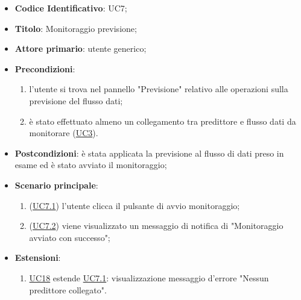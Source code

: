 		\begin{itemize}
			\item\textbf{Codice Identificativo}: UC7;
			\item\textbf{Titolo}: Monitoraggio previsione;
			\item\textbf{Attore primario}: utente generico;
			\item\textbf{Precondizioni}:
				\begin{enumerate}
					\item l'utente si trova nel pannello "Previsione" relativo alle operazioni sulla previsione del flusso dati;
					\item è stato effettuato almeno un collegamento tra predittore e flusso dati da monitorare (\hyperref[par:UC3]{UC3}).
				\end{enumerate}		
	\item\textbf{Postcondizioni}: è stata applicata la previsione al flusso di dati preso in esame ed è stato avviato il monitoraggio;
			\item\textbf{Scenario principale}:
				\begin{enumerate}
					\item (\hyperref[par:UC7.1]{UC7.1}) l'utente clicca il pulsante di avvio monitoraggio;
					\item (\hyperref[par:UC7.2]{UC7.2}) viene visualizzato un messaggio di notifica di "Monitoraggio avviato con successo";					
				\end{enumerate}
			\item\textbf{Estensioni}:
				\begin{enumerate}
					\item \hyperref[par:UC18]{UC18} estende \hyperref[par:UC7.1]{UC7.1}: visualizzazione messaggio d'errore "Nessun predittore collegato".

				\end{enumerate}
		\end{itemize}

	\label{par:UC7.1}
